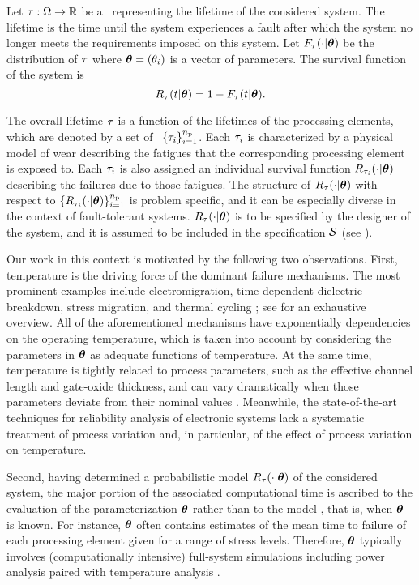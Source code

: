 Let $\tau: \Omega \to \mathbb{R}$ be a \rv\ representing the lifetime of the considered system.
The lifetime is the time until the system experiences a fault after which the system no longer meets the requirements imposed on this system.
Let $F_\tau(\cdot | \bm{\theta})$ be the distribution of $\tau$ where $\bm{\theta} = (\theta_i)$ is a vector of parameters.
The survival function of the system is
\[
  R_\tau(t | \bm{\theta}) = 1 - F_\tau(t | \bm{\theta}).
\]

The overall lifetime $\tau$ is a function of the lifetimes of the processing elements, which are denoted by a set of \rvs\ $\{ \tau_i \}_{i = 1}^{n_\text{p}}$.
Each $\tau_i$ is characterized by a physical model of wear \cite{jedec} describing the fatigues that the corresponding processing element is exposed to.
Each $\tau_i$ is also assigned an individual survival function $R_{\tau_i}(\cdot | \bm{\theta})$ describing the failures due to those fatigues.
The structure of $R_\tau(\cdot | \bm{\theta})$ with respect to $\{ R_{\tau_i}(\cdot | \bm{\theta}) \}_{i = 1}^{n_\text{p}}$ is problem specific, and it can be especially diverse in the context of fault-tolerant systems.
$R_\tau(\cdot | \bm{\theta})$ is to be specified by the designer of the system, and it is assumed to be included in the specification $\mathcal{S}$ (see ).

Our work in this context is motivated by the following two observations.
First, temperature is the driving force of the dominant failure mechanisms.
The most prominent examples include electromigration, time-dependent dielectric breakdown, stress migration, and thermal cycling \cite{xiang2010}; see \cite{jedec} for an exhaustive overview.
All of the aforementioned mechanisms have exponentially dependencies on the operating temperature, which is taken into account by considering the parameters in $\bm{\theta}$ as adequate functions of temperature.
At the same time, temperature is tightly related to process parameters, such as the effective channel length and gate-oxide thickness, and can vary dramatically when those parameters deviate from their nominal values \cite{ukhov2014, juan2012}.
Meanwhile, the state-of-the-art techniques for reliability analysis of electronic systems lack a systematic treatment of process variation and, in particular, of the effect of process variation on temperature.

Second, having determined a probabilistic model $R_\tau(\cdot | \bm{\theta})$ of the considered system, the major portion of the associated computational time is ascribed to the evaluation of the parameterization $\bm{\theta}$ rather than to the model \perse, that is, when $\bm{\theta}$ is known.
For instance, $\bm{\theta}$ often contains estimates of the mean time to failure of each processing element given for a range of stress levels.
Therefore, $\bm{\theta}$ typically involves (computationally intensive) full-system simulations including power analysis paired with temperature analysis \cite{xiang2010}.


